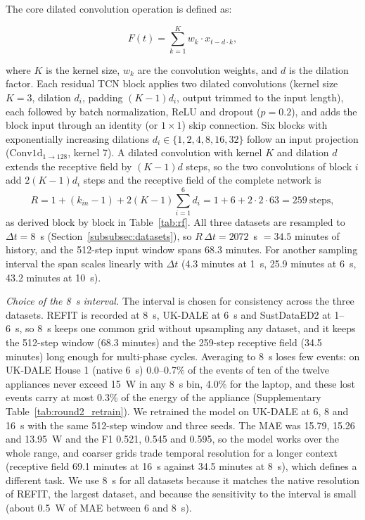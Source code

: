 \documentclass[fleqn,10pt]{wlscirep}
\begin{document}
The core dilated convolution operation is defined as:

\begin{equation}
\label{eq:dilated_conv}
F(t) = \sum_{k=1}^{K} w_k \cdot x_{t - d \cdot k},
\end{equation}

where $K$ is the kernel size, $w_k$ are the convolution weights, and $d$ is the dilation factor. Each residual TCN block applies two dilated convolutions (kernel size $K=3$, dilation $d_i$, padding $(K-1)d_i$, output trimmed to the input length), each followed by batch normalization, ReLU and dropout ($p=0.2$), and adds the block input through an identity (or $1{\times}1$) skip connection. Six blocks with exponentially increasing dilations $d_i\in\{1,2,4,8,16,32\}$ follow an input projection ($\mathrm{Conv1d}_{1\rightarrow128}$, kernel 7). A dilated convolution with kernel $K$ and dilation $d$ extends the receptive field by $(K-1)d$ steps, so the two convolutions of block $i$ add $2(K-1)d_i$ steps and the receptive field of the complete network is
\begin{equation}
\label{eq:rf}
R = 1+(k_{in}-1)+2(K-1)\sum_{i=1}^{6} d_i = 1+6+2\cdot 2\cdot 63 = 259\ \text{steps},
\end{equation}
as derived block by block in Table~\ref{tab:rf}. All three datasets are resampled to $\Delta t=8$~s (Section~\ref{subsubsec:datasets}), so $R\,\Delta t = 2072$~s $=34.5$ minutes of history, and the 512-step input window spans 68.3 minutes. For another sampling interval the span scales linearly with $\Delta t$ (4.3 minutes at 1~s, 25.9 minutes at 6~s, 43.2 minutes at 10~s).

\textit{Choice of the 8~s interval.} The interval is chosen for consistency across the three datasets. REFIT is recorded at 8~s, UK-DALE at 6~s and SustDataED2 at 1--6~s, so 8~s keeps one common grid without upsampling any dataset, and it keeps the 512-step window (68.3 minutes) and the 259-step receptive field (34.5 minutes) long enough for multi-phase cycles. Averaging to 8~s loses few events: on UK-DALE House 1 (native 6~s) 0.0--0.7\% of the events of ten of the twelve appliances never exceed 15~W in any 8~s bin, 4.0\% for the laptop, and these lost events carry at most 0.3\% of the energy of the appliance (Supplementary Table~\ref{tab:round2_retrain}). We retrained the model on UK-DALE at 6, 8 and 16~s with the same 512-step window and three seeds. The MAE was 15.79, 15.26 and 13.95~W and the F1 0.521, 0.545 and 0.595, so the model works over the whole range, and coarser grids trade temporal resolution for a longer context (receptive field 69.1 minutes at 16~s against 34.5 minutes at 8~s), which defines a different task. We use 8~s for all datasets because it matches the native resolution of REFIT, the largest dataset, and because the sensitivity to the interval is small (about 0.5~W of MAE between 6 and 8~s).
\end{document}
